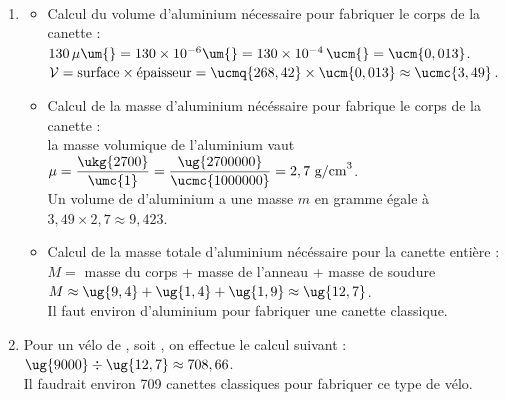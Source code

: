 \begin{corrige}
\ \\ [-5mm]
   \begin{enumerate}
      \item
         \begin{itemize}
            \item Calcul du volume d'aluminium nécessaire pour fabriquer le corps de la canette : \\
               $130\,\mu\um{} =130\times10^{-6}\um{} =130\times10^{-4}\,\ucm{} =\ucm{0,013}$. \\
               $\mathcal{V} =\text{surface}\times\text{épaisseur} =\ucmq{268,42}\times\ucm{0,013} \approx\ucmc{3,49}$. \\
            \item Calcul de la masse d'aluminium nécéssaire pour fabrique le corps de la canette : \\ [1mm]
               la masse volumique de l'aluminium vaut $\mu =\dfrac{\ukg{2700}}{\umc{1}} =\dfrac{\ug{2700000}}{\ucmc{1000000}} =2,7\text{ g/cm}^3$. \\ [1mm]
               Un volume de  d'aluminium a une masse $m$ en gramme égale à $3,49\times2,7 \approx9,423$.
            \item Calcul de la masse totale d'aluminium nécéssaire pour la canette entière : \\
               $M =$ masse du corps + masse de l'anneau + masse de soudure \\
               $M \approx\ug{9,4}+\ug{1,4}+\ug{1,9} \approx\ug{12,7}$. \\
               {\blue Il faut environ  d'aluminium pour fabriquer une canette classique}.
         \end{itemize}
      \item Pour un vélo de , soit , on effectue le calcul suivant : \\
         $\ug{9000}\div\ug{12,7} \approx 708,66$. \\
         {\blue Il faudrait environ 709 canettes classiques pour fabriquer ce type de vélo}.
   \end{enumerate}
\end{corrige}

\bigskip


